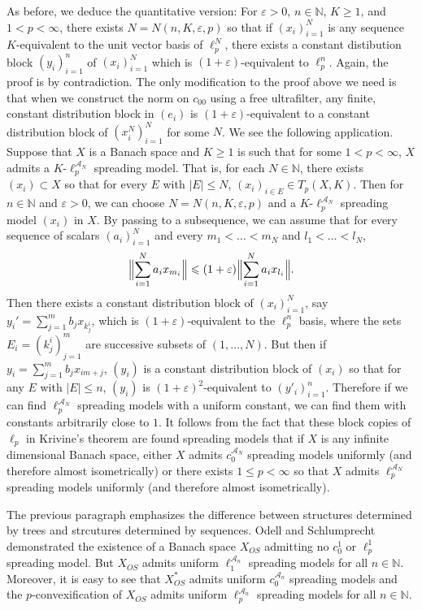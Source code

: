 \documentclass[12pt]{amsart}
\theoremstyle{definition}
\newcommand{\nn}{\mathbb{N}}
\newcommand{\aaa}{\mathcal{A}}
\begin{document}
As before, we deduce the quantitative version:  For $\varepsilon>0$, $n\in \nn$, $K\geqslant 1$, and $1<p<\infty$, there exists $N=N(n, K, \varepsilon,p)$ so that if $(x_i)_{i=1}^N$ is any sequence $K$-equivalent to the unit vector basis of $\ell_p^N$, there exists a constant distibution block $(y_i)_{i=1}^n$ of $(x_i)_{i=1}^N$ which is $(1+\varepsilon)$-equivalent to $\ell_p^n$.  Again, the proof is by contradiction.  The only modification to the proof above we need is that when we construct the norm on $c_{00}$ using a free ultrafilter, any finite, constant distribution block in $(e_i)$ is $(1+\varepsilon)$-equivalent to a constant distribution block of $(x_i^N)_{i=1}^N$ for some $N$.  We see the following application.  Suppose that $X$ is a Banach space and $K\geqslant 1$ is such that for some $1<p<\infty$, $X$ admits a $K$-$\ell_p^{\aaa_N}$ spreading model.   That is, for each $N\in \nn$, there exists $(x_i)\subset X$ so that for every $E$ with $|E|\leqslant N$, $(x_i)_{i\in E}\in T_p(X, K)$.  Then for $n\in \nn$ and $\varepsilon>0$, we can choose $N=N(n, K, \varepsilon, p)$ and a $K$-$\ell_p^{\aaa_N}$ spreading model $(x_i)$ in $X$.  By passing to a subsequence, we can assume that for every sequence of scalars $(a_i)_{i=1}^N$ and every $m_1<\ldots <m_N$ and $l_1<\ldots <l_N$, $$\Bigl\|\sum_{i=1}^N a_ix_{m_i}\Bigr\|\leqslant (1+\varepsilon)\Bigl\|\sum_{i=1}^N a_i x_{l_i}\Bigr\|.$$  Then there exists a constant distribution block of $(x_i)_{i=1}^N$, say $y_i'=\sum_{j=1}^m b_j x_{k_j^i}$, which is $(1+\varepsilon)$-equivalent to the $\ell_p^n$ basis, where the sets $E_i=(k^i_j)_{j=1}^m$ are successive subsets of $(1, \ldots, N)$.  But then if $y_i=\sum_{j=1}^m b_j x_{im+j}$, $(y_i)$ is a constant distribution block of $(x_i)$ so that for any $E$ with $|E|\leqslant n$, $(y_i)$ is $(1+\varepsilon)^2$-equivalent to $(y'_i)_{i=1}^n$.  Therefore if we can find $\ell_p^{\aaa_N}$ spreading models with a uniform constant, we can find them with constants arbitrarily close to $1$.  It follows from the fact that these block copies of $\ell_p$ in Krivine's theorem are found spreading models that if $X$ is any infinite dimensional Banach space, either $X$ admits $c_0^{\aaa_N}$ spreading models uniformly (and therefore almost isometrically) or there exists $1\leqslant p<\infty$ so that $X$ admits $\ell_p^{\aaa_N}$ spreading models uniformly (and therefore almost isometrically).  

The previous paragraph emphasizes the difference between structures determined by trees and strcutures determined by sequences.  Odell and Schlumprecht \cite{OS1} demonstrated the existence of a Banach space $X_{OS}$ admitting no $c_0^1$ or $\ell_p^1$ spreading model.  But $X_{OS}$ admits uniform $\ell_1^{\aaa_n}$ spreading models for all $n\in \nn$.  Moreover, it is easy to see that $X_{OS}^*$ admits uniform $c_0^{\aaa_n}$ spreading models and the $p$-convexification of $X_{OS}$ admits uniform $\ell_p^{\aaa_n}$ spreading models for all $n\in \nn$. 
\end{document}
